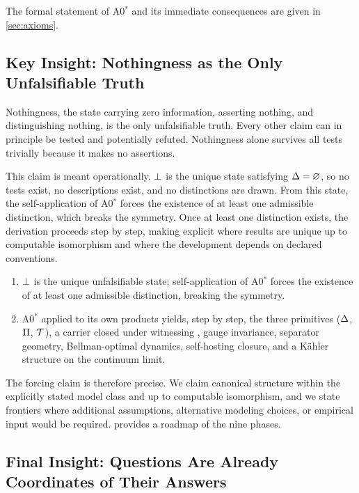 The formal statement of A0$^*$ and its immediate consequences are given in
\cref{sec:axioms}.

\subsection{Key Insight: Nothingness as the Only Unfalsifiable Truth}

Nothingness, the state carrying zero information, asserting nothing, and
distinguishing nothing, is the only unfalsifiable truth. Every other claim can
in principle be tested and potentially refuted. Nothingness alone survives all
tests trivially because it makes no assertions.

This claim is meant operationally. $\bot$ is the unique state satisfying
$\Delta = \varnothing$, so no tests exist, no descriptions exist, and no
distinctions are drawn. From this state, the self-application of A0$^*$ forces the
existence of at least one admissible distinction, which breaks the symmetry.
Once at least one distinction exists, the derivation proceeds step by step,
making explicit where results are unique up to computable isomorphism and
where the development depends on declared conventions.

\begin{enumerate}[label=\textbf{S\arabic*}.]
  \item $\bot$ is the unique unfalsifiable state; self-application of A0$^*$
        forces the existence of at least one admissible distinction, breaking
        the symmetry.
  \item A0$^*$ applied to its own products yields, step by step, the three
        primitives ($\Delta$, $\Pi$, $\mathcal{T}$), a carrier closed under
        witnessing \citep{church1936, turing1936}, gauge invariance,
        separator geometry, Bellman-optimal dynamics, self-hosting closure,
        and a K\"{a}hler structure on the continuum limit.
\end{enumerate}

The forcing claim is therefore precise. We claim canonical structure within
the explicitly stated model class and up to computable isomorphism, and we
state frontiers where additional assumptions, alternative modeling choices, or
empirical input would be required.   provides a
roadmap of the nine phases.



\subsection{Final Insight: Questions Are Already Coordinates of Their Answers}

